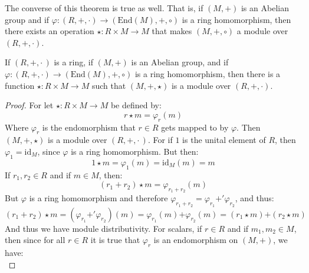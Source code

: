     The converse of this theorem is true as well. That is, if
    $(M,\boldsymbol{+})$ is an Abelian group and if
    $\varphi:(R,+,\cdot)\rightarrow(\textrm{End}(M),\boldsymbol{+},\circ)$ is
    a ring homomorphism, then there exists an operation
    $\star:R\times{M}\rightarrow{M}$ that makes $(M,\boldsymbol{+},\circ)$ a
    module over $(R,+,\cdot)$.
    \begin{theorem}
        If $(R,+,\cdot\,)$ is a ring, if $(M,\boldsymbol{+})$ is an Abelian
        group, and if
        $\varphi:(R,+,\cdot)\rightarrow(\textrm{End}(M),\boldsymbol{+},\circ)$
        is a ring homomorphism, then there is a function
        $\star:R\times{M}\rightarrow{M}$ such that $(M,\boldsymbol{+},\star)$ is
        a module over $(R,+,\cdot)$.
    \end{theorem}
    \begin{proof}
        For let $\star:R\times{M}\rightarrow{M}$ be defined by:
        \begin{equation}
            r\star{m}=\varphi_{r}(m)
        \end{equation}
        Where $\varphi_{r}$ is the endomorphism that $r\in{R}$ gets mapped to
        by $\varphi$. Then $(M,\boldsymbol{+},\star)$ is a module over
        $(R,+,\cdot\,)$. For if $1$ is the unital element of $R$, then
        $\varphi_{1}=\textrm{id}_{M}$, since $\varphi$ is a ring homomorphism.
        But then:
        \begin{equation}
            1\star{m}=\varphi_{1}(m)=\textrm{id}_{M}(m)=m
        \end{equation}
        If $r_{1},r_{2}\in{R}$ and if $m\in{M}$, then:
        \begin{equation}
            (r_{1}+r_{2})\star{m}=\varphi_{r_{1}+r_{2}}(m)
        \end{equation}
        But $\varphi$ is a ring homomorphism and therefore
        $\varphi_{r_{1}+r_{2}}=\varphi_{r_{1}}\boldsymbol{+}'\varphi_{r_{2}}$,
        and thus:
        \begin{equation}
            (r_{1}+r_{2})\star{m}=
            (\varphi_{r_{1}}\boldsymbol{+}'\varphi_{r_{2}})(m)
            =\varphi_{r_{1}}(m)\boldsymbol{+}\varphi_{r_{2}}(m)
            =(r_{1}\star{m})\boldsymbol{+}(r_{2}\star{m})
        \end{equation}
        And thus we have module distributivity. For scalars, if $r\in{R}$ and if
        $m_{1},m_{2}\in{M}$, then since for all $r\in{R}$ it is true that
        $\varphi_{r}$ is an endomorphism on $(M,\boldsymbol{+})$, we have:
        \begin{equation}

\end{equation}
\end{proof}
